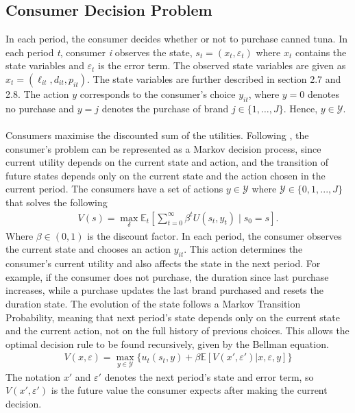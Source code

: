 \subsection{Consumer Decision Problem} 
In each period, the consumer decides whether or not to purchase canned tuna. In each period \textit{t}, consumer \textit{i} observes the state, $s_t = (x_{t},\varepsilon_{t})$ where $x_t$ contains the state variables and $\varepsilon_t$ is the error term. The observed state variables are given as $x_t = (\ell_{it},d_{it},p_{it})$. The state variables are further described in section 2.7 and 2.8.  The action \(y\) corresponds to the consumer's choice \(y_{it}\), where \(y=0\) denotes no purchase and \(y=j\) denotes the purchase of brand \(j \in \{1,\ldots,J\}\). Hence, \(y \in \mathcal{Y}\).
\\
\\
Consumers maximise the discounted sum of the utilities. Following \cite{rust1994structural}, the consumer's problem can be represented as a Markov decision process, since current utility depends on the current state and action, and the transition of future states depends only on the current state and the action chosen in the current period. The consumers have a set of actions $y \in \mathcal{Y}$ where $\mathcal{Y} \in \{0,1,...,J\}$ that solves the following 
\begin{align*}
    V(s)
=
\max_{\delta}
\mathbb{E}_t
\left[
\sum_{t=0}^{\infty}
\beta^t
U(s_t,y_t)
\mid s_0=s
\right].
\end{align*}
Where $\beta \in (0,1)$ is the discount factor. In each period, the consumer observes the current state and chooses an action $y_{it}$. This action determines the consumer's current utility and also affects the state in the next period. For example, if the consumer does not purchase, the duration since last purchase increases, while a purchase updates the last brand purchased and resets the duration state. The evolution of the state follows a Markov Transition Probability, meaning that next period's state depends only on the current state and the current action, not on the full history of previous choices. This allows the optimal decision rule to be found recursively, given by the Bellman equation.
\begin{align*} 
    V(x,\varepsilon) =\max_{y \in \mathcal{Y}} \{ u_t(s_t,y) + \beta \mathbb{E}[V(x',\varepsilon')\vert x, \varepsilon,y]\} \tag{2.1}
\end{align*}
The notation \(x'\) and \(\varepsilon'\) denotes the next period's state and error term, so \(V(x',\varepsilon')\) is the future value the consumer expects after making the current decision.
